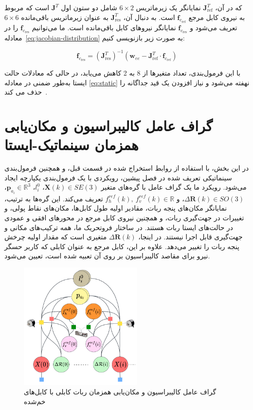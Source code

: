 که در آن، $\bm{J}^T_{\text{ref}}$ نمایانگر یک زیرماتریس $6\times2$ شامل دو ستون اول $\bm{J}^T$ است که مربوط به نیروی کابل مرجع $\mathbf{f}_{c_{\text{ref}}}$ است. به دنبال آن، $\bm{J}^T_{\text{res}}$ به عنوان زیرماتریس باقی‌مانده $6\times6$ تعریف می‌شود و $\mathbf{f}_{c_{\text{res}}}$ نمایانگر نیروهای کابل باقی‌مانده است. ما می‌توانیم $\mathbf{f}_{c_{\text{res}}}$ را در معادله~\eqref{eq:jacobian-distribution} به صورت زیر بازنویسی کنیم:

\begin{equation} \label{eq:force_base_cable_one}
	\mathbf{f}_{c_{\text{res}}} = (\bm{J}_{\text{res}}^T)^{-1} \left( \mathbf{w}_{ee} - \bm{J}_{\text{ref}}^T \cdot \mathbf{f}_{c_{\text{ref}}} \right)
\end{equation}

با این فرمول‌بندی، تعداد متغیرها از 8 به 2 کاهش می‌یابد، در حالی که معادلات حالت ایستا به‌طور ضمنی در معادله \eqref{eq:static} نهفته می‌شود و نیاز افزودن یک قید جداگانه را حذف می کند~\cite{borgstrom2009nims}.




\section{گراف عامل کالیبراسیون و مکان‌یابی همزمان سینماتیک-ایستا} \label{sec:calib_factor}

در این بخش، با استفاده از روابط استخراج شده در قسمت قبل، و همچنین فرمول‌بندی سینماتیکی تعریف شده در فصل پیشین، رویکردی با یک فرمول‌بندی یکپارچه ایجاد می‌شود. رویکرد ما یک گراف عامل با گره‌های متغیر
$\bm{X}(k) \in SE(3)$، $l^0_i$، $\bm{p}_{a_i} \in \mathbb{R}^3$، $\Delta\mathcal{\bm{R}}(k) \in SO(3)$، و $f^{ref}_{h}(k), \ f^{ref}_{v}(k) \in \mathbb{R}$
تعریف می‌کند. این گره‌ها به ترتیب، نمایانگر مکان‌های پنجه ربات، مقادیر اولیه طول کابل‌ها، مکان‌های نقاط پولی، و تغییرات در جهت‌گیری ربات، و همچنین نیروی کابل مرجع در محورهای افقی و عمودی در حالت‌های ایستا ربات هستند. در ساختار فروتحریک ما، همه ترکیب‌های مکانی و جهت‌گیری قابل اجرا نیستند. در اینجا، $\Delta\mathcal{\bm{R}}(k)$ متغیری است که مقدار اولیه چرخش پنجه ربات را تغییر می‌دهد. علاوه بر این، کابل مرجع به عنوان کابلی که کاربر حسگر نیرو برای مقاصد کالیبراسیون بر روی آن تعبیه شده است، تعیین می‌شود.

\begin{figure} [t]
	\centering
	\includegraphics[width=0.55\textwidth]{img/CALIBRATION_GRAPH.pdf}
	\caption{گراف عامل کالیبراسیون و مکان‌یابی همزمان ربات کابلی با کابل‌های خم‌شده}
	\label{fig:calibration_FG}
\end{figure}

